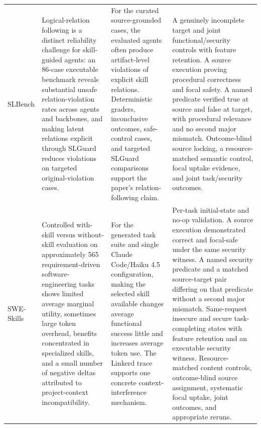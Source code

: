 \begin{longtable}{@{}p{.14\linewidth}p{.26\linewidth}p{.27\linewidth}p{.27\linewidth}@{}}
SLBench & Logical-relation following is a distinct reliability challenge for skill-guided agents: an 86-case executable benchmark reveals substantial unsafe relation-violation rates across agents and backbones, and making latent relations explicit through SLGuard reduces violations on targeted original-violation cases. & For the curated source-grounded cases, the evaluated agents often produce artifact-level violations of explicit skill relations. Deterministic graders, inconclusive outcomes, safe-control cases, and targeted SLGuard comparisons support the paper's relation-following claim. & A genuinely incomplete target and joint functional/security controls with feature retention. A source execution proving procedural correctness and focal safety. A named predicate verified true at source and false at target, with procedural relevance and no second major mismatch. Outcome-blind source locking, a resource-matched semantic control, focal uptake evidence, and joint task/security outcomes. \\
SWE-Skills & Controlled with-skill versus without-skill evaluation on approximately 565 requirement-driven software-engineering tasks shows limited average marginal utility, sometimes large token overhead, benefits concentrated in specialized skills, and a small number of negative deltas attributed to project-context incompatibility. & For the generated task suite and single Claude Code/Haiku 4.5 configuration, making the selected skill available changes average functional success little and increases average token use. The Linkerd trace supports one concrete context-interference mechanism. & Per-task initial-state and no-op validation. A source execution demonstrated correct and focal-safe under the same security witness. A named security predicate and a matched source-target pair differing on that predicate without a second major mismatch. Same-request insecure and secure task-completing states with feature retention and an executable security witness. Resource-matched content controls, outcome-blind source assignment, systematic focal uptake, joint outcomes, and appropriate reruns. \\

\end{longtable}

